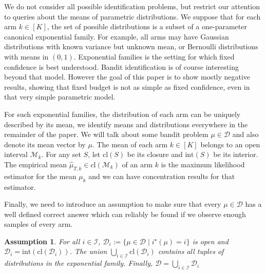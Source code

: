 \documentclass{article}
\newtheorem{assumption}{Assumption}
\begin{document}
We do not consider all possible identification problems, but restrict our attention to queries about the means of parametric distributions. We suppose that for each arm $k \in [K]$, the set of possible distributions is a subset of a one-parameter canonical exponential family.
For example, all arms may have Gaussian distributions with known variance but unknown mean, or Bernoulli distributions with means in $(0,1)$.
Exponential families is the setting for which fixed confidence is best understood. Bandit identification is of course interesting beyond that model. However the goal of this paper is to show mostly negative results, showing that fixed budget is not as simple as fixed confidence, even in that very simple parametric model.

For such exponential families, the distribution of each arm can be uniquely described by its mean, we identify means and distributions everywhere in the remainder of the paper. We will talk about some bandit problem $\mu \in \mathcal D$ and also denote its mean vector by $\mu$.
The mean of each arm $k \in [K]$ belongs to an open interval $\mathcal M_k$. For any set $S$, let $\mathrm{cl}(S)$ be its closure and $\mathrm{int}(S)$ be its interior.
The empirical mean $\hat{\mu}_{T,k} \in \mathrm{cl}(\mathcal M_k)$ of an arm $k$ is the maximum likelihood estimator for the mean $\mu_k$ and we can have concentration results for that estimator.


Finally, we need to introduce an assumption to make sure that every $\mu \in \mathcal D$ has a well defined correct answer which can reliably be found if we observe enough samples of every arm. 


\begin{assumption}\label{asm:answer_nhds}
For all $i \in \mathcal I$, $\mathcal D_i := \{\mu \in \mathcal D \mid i^\star(\mu) = i\}$ is open and $\mathcal D_i = \mathrm{int}(\mathrm{cl}(\mathcal D_i))$.
The union $\bigcup_{i \in \mathcal I} \mathrm{cl}(\mathcal D_i)$ contains all tuples of distributions in the exponential family. Finally, $\mathcal D = \bigcup_{i \in \mathcal I} \mathcal D_i$
\end{assumption}
\end{document}
